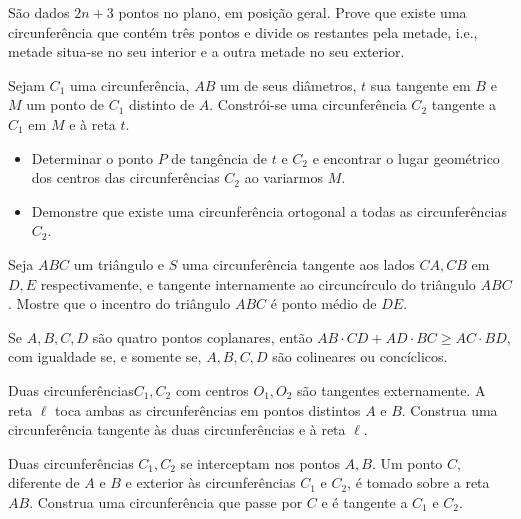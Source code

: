 \begin{questao}  
  São dados $2n+3$ pontos no plano, em posição
  geral. Prove que existe uma circunferência que contém três pontos
  e divide os restantes pela metade, i.e., metade situa-se no seu
  interior e a outra metade no seu exterior.
\end{questao}

\begin{questao}
  Sejam $C_1$ uma circunferência, $AB$ um de seus
  diâmetros, $t$ sua tangente em $B$ e $M$ um ponto de $C_1$
  distinto de $A$. Constrói-se uma circunferência $C_2$ tangente a
  $C_1$ em $M$ e à reta $t$.

  \begin{itemize}
    \item Determinar o ponto $P$ de tangência de $t$ e $C_2$ e encontrar o lugar
    geométrico dos centros das circunferências $C_2$ ao variarmos $M$.

    \item Demonstre que existe uma circunferência ortogonal a todas as
    circunferências $C_2$.
  \end{itemize}
\end{questao}

\begin{questao}
  Seja $ABC$ um triângulo e $S$ uma circunferência
  tangente aos lados $CA,CB$ em $D,E$ respectivamente, e tangente
  internamente ao circuncírculo do triângulo $ABC$. Mostre que o
  incentro do triângulo $ABC$ é ponto médio de $DE$.
\end{questao}

\begin{questao}
  Se $A,B,C,D$ são quatro pontos coplanares, então $AB
  \cdot CD + AD \cdot BC \geq AC \cdot BD $, com igualdade se, e
  somente se, $A,B,C,D$ são colineares ou concíclicos.
\end{questao}

\begin{questao}
  Duas circunferências$C_1,C_2$ com centros $O_1,O_2$
  são tangentes externamente. A reta $\ell$ toca ambas as
  circunferências em pontos distintos $A$ e $B$. Construa uma
  circunferência tangente às duas circunferências e à reta $\ell$.
\end{questao}

\begin{questao}
  Duas circunferências $C_1,C_2$ se interceptam nos pontos
  $A,B$. Um ponto $C$, diferente de $A$ e $B$ e exterior às
  circunferências $C_1$ e $C_2$, é tomado sobre a reta
  $AB$. Construa uma circunferência que passe por $C$ e é tangente
  a $C_1$ e $C_2$.
\end{questao}

